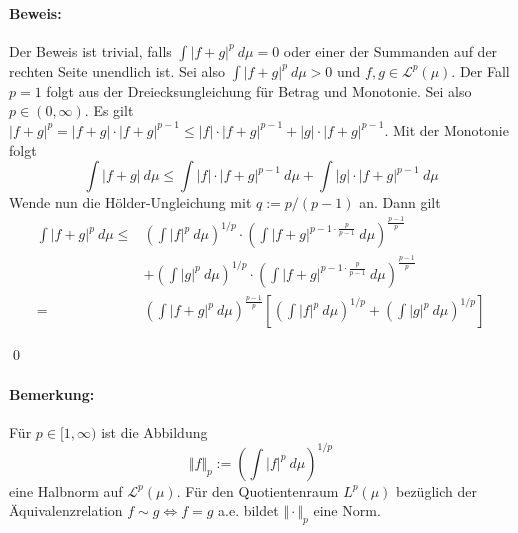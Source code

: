  \paragraph{Beweis:}Der Beweis ist trivial, falls $\displaystyle\int |f+g|^p\ d\mu=0$ oder einer der Summanden auf der rechten Seite unendlich ist. Sei also $\displaystyle\int |f+g|^p\ d\mu>0$ und $f,g\in\mathcal{L}^p(\mu)$. Der Fall $p=1$ folgt aus der Dreiecksungleichung f\"ur Betrag und Monotonie. Sei also $p\in(0,\infty)$. Es gilt $|f+g|^p=|f+g|\cdot|f+g|^{p-1}\leq|f|\cdot|f+g|^{p-1}+|g|\cdot|f+g|^{p-1}$. Mit der Monotonie folgt
 $$\int|f+g|\ d\mu\leq\int |f|\cdot|f+g|^{p-1}\ d\mu+\int |g|\cdot|f+g|^{p-1}\ d\mu$$
 Wende nun die H\"older-Ungleichung mit $q:=p/(p-1)$ an. Dann gilt
 \begin{align*}
     \int|f+g|^p\ d\mu
     \leq& \left(\int |f|^p\ d\mu\right)^{1/p}\cdot\left(\int |f+g|^{p-1\cdot\frac{p}{p-1}}\ d\mu\right)^{\frac{p-1}{p}}\\&+\left(\int |g|^p\ d\mu\right)^{1/p}\cdot\left(\int |f+g|^{p-1\cdot\frac{p}{p-1}}\ d\mu\right)^{\frac{p-1}{p}}\\
     =&\left(\int |f+g|^p\ d\mu\right)^{\frac{p-1}{p}}\left[\left(\int |f|^p\ d\mu\right)^{1/p}+\left(\int |g|^p\ d\mu\right)^{1/p}\right]
 \end{align*}
 
 \qed
 
 \paragraph{Bemerkung:}F\"ur $p\in[1,\infty)$ ist die Abbildung
 $$\Vert f\Vert_p:=\left(\int |f|^p\ d\mu\right)^{1/p}$$
eine Halbnorm auf $\mathcal{L}^p(\mu)$. F\"ur den Quotientenraum $L^p(\mu)$ bez\"uglich der \"Aquivalenzrelation $f\sim g\iff f=g$ a.e. bildet $\Vert\cdot \Vert_p$ eine Norm.
 